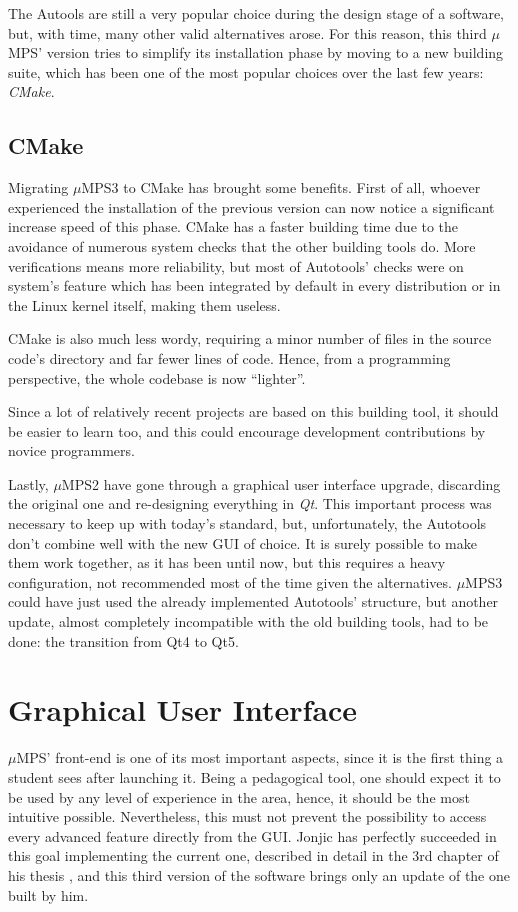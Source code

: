 \documentclass[12pt,a4paper,openright,twoside]{report}
\begin{document}
The Autools are still a very popular choice during the design stage of a software, but, with time, many other valid alternatives arose.
For this reason, this third $\mu$MPS' version tries to simplify its installation phase by moving to a new building suite, which has been one of the most popular choices over the last few years: \textit{CMake}.

\subsection{CMake}
Migrating $\mu$MPS3 to CMake has brought some benefits.
First of all, whoever experienced the installation of the previous version can now notice a significant increase speed of this phase.
CMake has a faster building time due to the avoidance of numerous system checks that the other building tools do.
More verifications means more reliability, but most of Autotools' checks were on system's feature which has been integrated by default in every distribution or in the Linux kernel itself, making them useless.

CMake is also much less wordy, requiring a minor number of files in the source code's directory and far fewer lines of code.
Hence, from a programming perspective, the whole codebase is now ``lighter''.

Since a lot of relatively recent projects are based on this building tool, it should be easier to learn too, and this could encourage development contributions by novice programmers.

Lastly, $\mu$MPS2 have gone through a graphical user interface upgrade, discarding the original one and re-designing everything in \textit{Qt}.
This important process was necessary to keep up with today's standard, but, unfortunately, the Autotools don't combine well with the new GUI of choice.
It is surely possible to make them work together, as it has been until now, but this requires a heavy configuration, not recommended most of the time given the alternatives.
$\mu$MPS3 could have just used the already implemented Autotools' structure, but another update, almost completely incompatible with the old building tools, had to be done: the transition from Qt4 to Qt5.

\section{Graphical User Interface}
$\mu$MPS' front-end is one of its most important aspects, since it is the first thing a student sees after launching it.
Being a pedagogical tool, one should expect it to be used by any level of experience in the area, hence, it should be the most intuitive possible.
Nevertheless, this must not prevent the possibility to access every advanced feature directly from the GUI.
Jonjic has perfectly succeeded in this goal implementing the current one, described in detail in the 3rd chapter of his thesis \cite{tjonjic}, and this third version of the software brings only an update of the one built by him.
\end{document}
